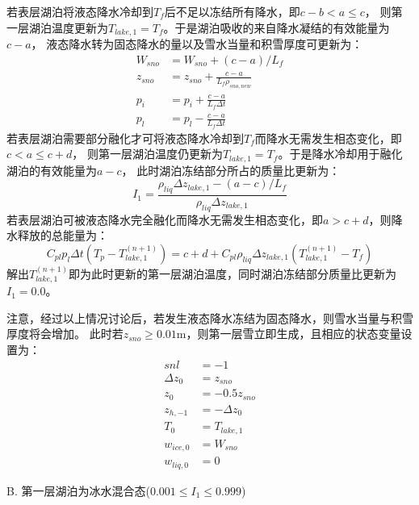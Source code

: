 若表层湖泊将液态降水冷却到$T_f$后不足以冻结所有降水，即$c-b<a\leqslant c$，
则第一层湖泊温度更新为$T_{lake,1}=T_f$。于是湖泊吸收的来自降水凝结的有效能量为$c-a$，
液态降水转为固态降水的量以及雪水当量和积雪厚度可更新为：
\begin{equation}
\begin{aligned}
W_{sno} &= W_{sno} + (c-a) / L_f \\ 
z_{sno} &= z_{sno} + \frac{c-a}{L_f \rho_{sno,new}} \\ 
p_i &= p_i + \frac{c-a}{L_f \Delta t} \\ 
p_l &= p_l - \frac{c-a}{L_f \Delta t}
\end{aligned}
\end{equation}
若表层湖泊需要部分融化才可将液态降水冷却到$T_f$而降水无需发生相态变化，即$c<a\leqslant c+d$，
则第一层湖泊温度仍更新为$T_{lake,1}=T_f$。于是降水冷却用于融化湖泊的有效能量为$a-c$，
此时湖泊冻结部分所占的质量比更新为：
\begin{equation}
I_{1}=\frac{\rho_{liq} \Delta z_{lake, 1}-(a-c) / L_{f}}{\rho_{liq} \Delta z_{lake, 1}}
\end{equation}
若表层湖泊可被液态降水完全融化而降水无需发生相态变化，即$a>c+d$，则降水释放的总能量为：
\begin{equation}
C_{pl} p_{l} \Delta t\left(T_{p}-T_{lake, 1}^{(n+1)}\right)=c+d+C_{pl} \rho_{liq} \Delta z_{lake, 1}\left(T_{lake, 1}^{(n+1)}-T_{f}\right)
\end{equation}
解出$T_{lake,1}^{\left(n+1\right)}$即为此时更新的第一层湖泊温度，同时湖泊冻结部分质量比更新为$I_1=0.0$。


注意，经过以上情况讨论后，若发生液态降水冻结为固态降水，则雪水当量与积雪厚度将会增加。
此时若$z_{sno}\geqslant 0.01$m，则第一层雪立即生成，且相应的状态变量设置为：
\begin{equation}
\begin{aligned}
    snl &= -1 \\ 
    \Delta z_{0} &= z_{sno} \\ 
    z_{0} &= -0.5 z_{sno} \\
    z_{h,-1} &= -\Delta z_{0} \\ 
    T_{0} &= T_{lake, 1} \\
    w_{ice, 0} &= W_{sno} \\
    w_{liq, 0} &= 0
\end{aligned}
\end{equation}

B. 第一层湖泊为冰水混合态($0.001\leqslant I_1\leqslant 0.999$)

